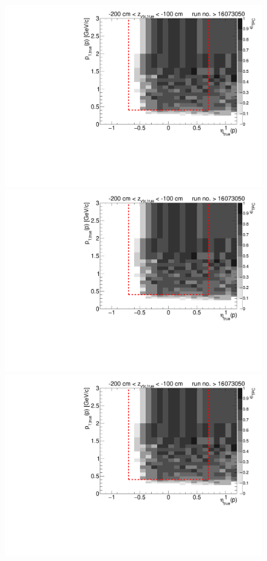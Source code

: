 \begin{figure}[hb]\ContinuedFloat
	\centering
	\parbox{0.495\textwidth}{
		\centering
		\includegraphics[width=\linewidth,page=11]{graphics/eff/Eff2D_TPC_proton_Minus_RunRange2.pdf}\\
		\includegraphics[width=\linewidth,page=13]{graphics/eff/Eff2D_TPC_proton_Minus_RunRange2.pdf}\\
		\includegraphics[width=\linewidth,page=15]{graphics/eff/Eff2D_TPC_proton_Minus_RunRange2.pdf}\\
}
\end{figure}
